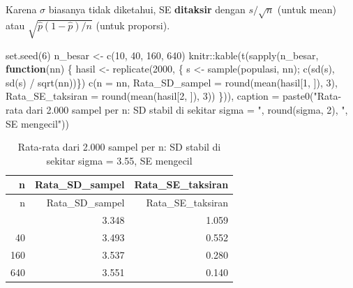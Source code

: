\documentclass[
  indonesian,
  letterpaper,
]{book}
\newenvironment{Shaded}{\begin{snugshade}}{\end{snugshade}}
\newcommand{\AttributeTok}[1]{\textcolor[rgb]{0.40,0.45,0.13}{#1}}
\newcommand{\ControlFlowTok}[1]{\textcolor[rgb]{0.00,0.23,0.31}{\textbf{#1}}}
\newcommand{\DecValTok}[1]{\textcolor[rgb]{0.68,0.00,0.00}{#1}}
\newcommand{\FunctionTok}[1]{\textcolor[rgb]{0.28,0.35,0.67}{#1}}
\newcommand{\NormalTok}[1]{\textcolor[rgb]{0.00,0.23,0.31}{#1}}
\newcommand{\OtherTok}[1]{\textcolor[rgb]{0.00,0.23,0.31}{#1}}
\newcommand{\SpecialCharTok}[1]{\textcolor[rgb]{0.37,0.37,0.37}{#1}}
\newcommand{\StringTok}[1]{\textcolor[rgb]{0.13,0.47,0.30}{#1}}
\begin{document}
Karena \(\sigma\) biasanya tidak diketahui, SE \textbf{ditaksir} dengan
\(s/\sqrt{n}\) (untuk mean) atau \(\sqrt{\hat{p}(1-\hat{p})/n}\) (untuk
proporsi).

\begin{Shaded}
\begin{Highlighting}[]
\FunctionTok{set.seed}\NormalTok{(}\DecValTok{6}\NormalTok{)}
\NormalTok{n\_besar }\OtherTok{\textless{}{-}} \FunctionTok{c}\NormalTok{(}\DecValTok{10}\NormalTok{, }\DecValTok{40}\NormalTok{, }\DecValTok{160}\NormalTok{, }\DecValTok{640}\NormalTok{)}
\NormalTok{knitr}\SpecialCharTok{::}\FunctionTok{kable}\NormalTok{(}\FunctionTok{t}\NormalTok{(}\FunctionTok{sapply}\NormalTok{(n\_besar, }\ControlFlowTok{function}\NormalTok{(nn) \{}
\NormalTok{hasil }\OtherTok{\textless{}{-}} \FunctionTok{replicate}\NormalTok{(}\DecValTok{2000}\NormalTok{, \{ s }\OtherTok{\textless{}{-}} \FunctionTok{sample}\NormalTok{(populasi, nn); }\FunctionTok{c}\NormalTok{(}\FunctionTok{sd}\NormalTok{(s), }\FunctionTok{sd}\NormalTok{(s) }\SpecialCharTok{/} \FunctionTok{sqrt}\NormalTok{(nn))\})}
\FunctionTok{c}\NormalTok{(}\AttributeTok{n =}\NormalTok{ nn, }\AttributeTok{Rata\_SD\_sampel =} \FunctionTok{round}\NormalTok{(}\FunctionTok{mean}\NormalTok{(hasil[}\DecValTok{1}\NormalTok{, ]), }\DecValTok{3}\NormalTok{),}
\AttributeTok{Rata\_SE\_taksiran =} \FunctionTok{round}\NormalTok{(}\FunctionTok{mean}\NormalTok{(hasil[}\DecValTok{2}\NormalTok{, ]), }\DecValTok{3}\NormalTok{))}
\NormalTok{\})), }\AttributeTok{caption =} \FunctionTok{paste0}\NormalTok{(}\StringTok{"Rata{-}rata dari 2.000 sampel per n: SD stabil di sekitar}
\StringTok{sigma = "}\NormalTok{,}
\FunctionTok{round}\NormalTok{(sigma, }\DecValTok{2}\NormalTok{), }\StringTok{", SE mengecil"}\NormalTok{))}
\end{Highlighting}
\end{Shaded}

\begin{longtable}[]{@{}rrr@{}}
\caption{Rata-rata dari 2.000 sampel per n: SD stabil di sekitar sigma =
3.55, SE mengecil}\tabularnewline
\toprule\noalign{}
n & Rata\_SD\_sampel & Rata\_SE\_taksiran \\
\midrule\noalign{}
\endfirsthead
\toprule\noalign{}
n & Rata\_SD\_sampel & Rata\_SE\_taksiran \\
\midrule\noalign{}
\endhead
\bottomrule\noalign{}
\endlastfoot
10 & 3.348 & 1.059 \\
40 & 3.493 & 0.552 \\
160 & 3.537 & 0.280 \\
640 & 3.551 & 0.140 \\
\end{longtable}
\end{document}
